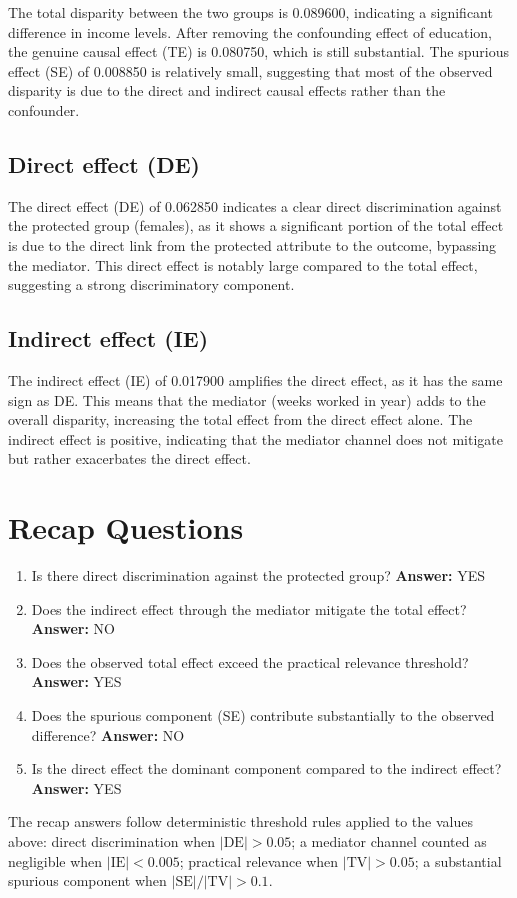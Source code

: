 \documentclass[11pt]{article}
\begin{document}
The total disparity between the two groups is 0.089600, indicating a significant difference in income levels. After removing the confounding effect of education, the genuine causal effect (TE) is 0.080750, which is still substantial. The spurious effect (SE) of 0.008850 is relatively small, suggesting that most of the observed disparity is due to the direct and indirect causal effects rather than the confounder.

\subsection{Direct effect (DE)}

The direct effect (DE) of 0.062850 indicates a clear direct discrimination against the protected group (females), as it shows a significant portion of the total effect is due to the direct link from the protected attribute to the outcome, bypassing the mediator. This direct effect is notably large compared to the total effect, suggesting a strong discriminatory component.

\subsection{Indirect effect (IE)}

The indirect effect (IE) of 0.017900 amplifies the direct effect, as it has the same sign as DE. This means that the mediator (weeks worked in year) adds to the overall disparity, increasing the total effect from the direct effect alone. The indirect effect is positive, indicating that the mediator channel does not mitigate but rather exacerbates the direct effect.

\section{Recap Questions}

\begin{enumerate}
\item Is there direct discrimination against the protected group? \textbf{Answer:} YES
\item Does the indirect effect through the mediator mitigate the total effect? \textbf{Answer:} NO
\item Does the observed total effect exceed the practical relevance threshold? \textbf{Answer:} YES
\item Does the spurious component (SE) contribute substantially to the observed difference? \textbf{Answer:} NO
\item Is the direct effect the dominant component compared to the indirect effect? \textbf{Answer:} YES
\end{enumerate}

\vspace{1em}
\noindent\footnotesize
The recap answers follow deterministic threshold rules applied to the values above: direct discrimination when $|\mathrm{DE}| > 0.05$; a mediator channel counted as negligible when $|\mathrm{IE}| < 0.005$; practical relevance when $|\mathrm{TV}| > 0.05$; a substantial spurious component when $|\mathrm{SE}| / |\mathrm{TV}| > 0.1$.
\end{document}

